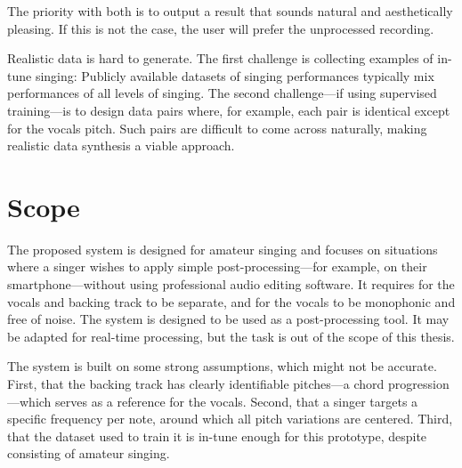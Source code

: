 The priority with both is to output a result that sounds natural and aesthetically pleasing. If this is not the case, the user will prefer the unprocessed recording. 

Realistic data is hard to generate. The first challenge is collecting examples of in-tune singing: Publicly available datasets of singing performances typically mix performances of all levels of singing. The second challenge---if using supervised training---is to design data pairs where, for example, each pair is identical except for the vocals pitch. Such pairs are difficult to come across naturally, making realistic data synthesis a viable approach.

\section{Scope}
The proposed system is designed for amateur singing and focuses on situations where a singer wishes to apply simple post-processing---for example, on their smartphone---without using professional audio editing software. It requires for the vocals and backing track to be separate, and for the vocals to be monophonic and free of noise. The system is designed to be used as a post-processing tool. It may be adapted for real-time processing, but the task is out of the scope of this thesis.

The system is built on some strong assumptions, which might not be accurate. First, that the backing track has clearly identifiable pitches---a chord progression---which serves as a reference for the vocals. Second, that a singer targets a specific frequency per note, around which all pitch variations are centered. Third, that the dataset used to train it is in-tune enough for this prototype, despite consisting of amateur singing. %
